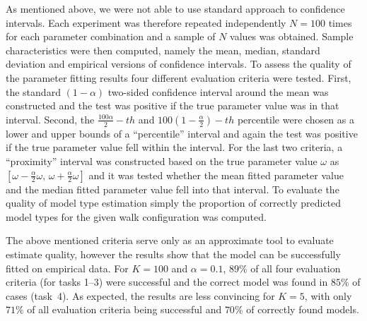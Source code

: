 \documentclass{amsart}
\theoremstyle{definition}
\theoremstyle{plain}
\theoremstyle{plain}
\theoremstyle{plain}
\numberwithin{equation}{section}
\begin{document}
    As mentioned above, we were not able to use standard approach to confidence intervals.
    Each experiment was therefore repeated independently $N=100$ times for each parameter combination and a sample of $N$ values was obtained.
    Sample characteristics were then computed, namely the mean, median, standard deviation and empirical versions of confidence intervals.
    To assess the quality of the parameter fitting results four different evaluation criteria were tested.
    First, the standard $(1-\alpha)$ two-sided confidence interval around the mean was constructed and the test was positive if the true parameter value was in that interval.
    Second, the $\frac{{100}\alpha}{2}-th$ and $100\left(1-\frac{\alpha}{2}\right)-th$ percentile were chosen as a lower and upper bounds of a ``percentile'' interval and again the test was positive if the true parameter value fell within the interval.
    {For the last two criteria}, a ``proximity'' interval was constructed based on the true parameter value {$\omega$ as $[\omega-\frac{\alpha}{2}\omega,\,\omega+\frac{\alpha}{2}\omega]$} and it was tested whether
    {the mean} fitted parameter value and { the median} fitted parameter value fell into that interval.
    To evaluate the quality of model type estimation simply the proportion of correctly predicted model types for the given walk configuration was computed.

    The above mentioned criteria serve only as an approximate tool to evaluate estimate quality, however the results show that the model can be successfully fitted on empirical data.
    For $K=100$ and $\alpha=0.1$, $89\%$ of all four evaluation criteria (for tasks 1--3) were successful and the correct model was found in $85\%$ of cases (task~4).
    As expected, the results are less convincing for $K=5$, with only $71\%$ of all evaluation criteria being successful and $70\%$ of correctly found models.
\end{document}
